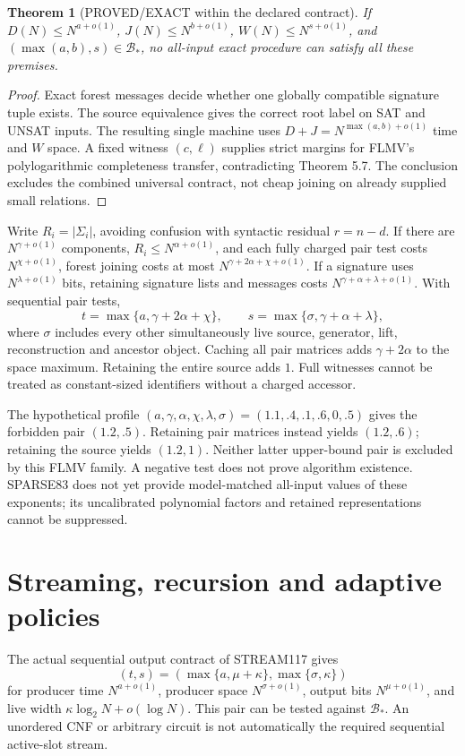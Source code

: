\documentclass[11pt]{article}
\newtheorem{theorem}{Theorem}
\begin{document}
\begin{theorem}[PROVED/EXACT within the declared contract]
If $D(N)\le N^{a+o(1)}$, $J(N)\le N^{b+o(1)}$, $W(N)\le N^{s+o(1)}$, and $(\max(a,b),s)\in\mathcal B_*$, no all-input exact procedure can satisfy all these premises.
\end{theorem}
\begin{proof}
Exact forest messages decide whether one globally compatible signature tuple exists. The source equivalence gives the correct root label on SAT and UNSAT inputs. The resulting single machine uses $D+J=N^{\max(a,b)+o(1)}$ time and $W$ space. A fixed witness $(c,\ell)$ supplies strict margins for FLMV's polylogarithmic completeness transfer, contradicting Theorem 5.7. The conclusion excludes the combined universal contract, not cheap joining on already supplied small relations.
\end{proof}

Write $R_i=|\Sigma_i|$, avoiding confusion with syntactic residual $r=n-d$. If there are $N^{\gamma+o(1)}$ components, $R_i\le N^{\alpha+o(1)}$, and each fully charged pair test costs $N^{\chi+o(1)}$, forest joining costs at most $N^{\gamma+2\alpha+\chi+o(1)}$. If a signature uses $N^{\lambda+o(1)}$ bits, retaining signature lists and messages costs $N^{\gamma+\alpha+\lambda+o(1)}$. With sequential pair tests,
\[
t=\max\{a,\gamma+2\alpha+\chi\},\qquad
s=\max\{\sigma,\gamma+\alpha+\lambda\},
\]
where $\sigma$ includes every other simultaneously live source, generator, lift, reconstruction and ancestor object. Caching all pair matrices adds $\gamma+2\alpha$ to the space maximum. Retaining the entire source adds $1$. Full witnesses cannot be treated as constant-sized identifiers without a charged accessor.

The hypothetical profile $(a,\gamma,\alpha,\chi,\lambda,\sigma)=(1.1,.4,.1,.6,0,.5)$ gives the forbidden pair $(1.2,.5)$. Retaining pair matrices instead yields $(1.2,.6)$; retaining the source yields $(1.2,1)$. Neither latter upper-bound pair is excluded by this FLMV family. A negative test does not prove algorithm existence. SPARSE83 does not yet provide model-matched all-input values of these exponents; its uncalibrated polynomial factors and retained representations cannot be suppressed.

\section{Streaming, recursion and adaptive policies}
The actual sequential output contract of STREAM117 gives
\[
(t,s)=(\max\{a,\mu+\kappa\},\max\{\sigma,\kappa\})
\]
for producer time $N^{a+o(1)}$, producer space $N^{\sigma+o(1)}$, output bits $N^{\mu+o(1)}$, and live width $\kappa\log_2N+o(\log N)$. This pair can be tested against $\mathcal B_*$. An unordered CNF or arbitrary circuit is not automatically the required sequential active-slot stream.
\end{document}
